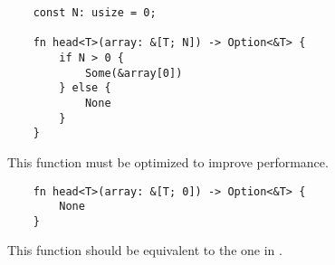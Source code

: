 \begin{listing}
    \begin{verbatim}
    const N: usize = 0;

    fn head<T>(array: &[T; N]) -> Option<&T> {
        if N > 0 {
            Some(&array[0])
        } else {
            None
        }
    }
    \end{verbatim}
    \caption{This function must be optimized to improve performance.}
    \label{lst:static_control_flow}
\end{listing}

\begin{listing}
    \begin{verbatim}
    fn head<T>(array: &[T; 0]) -> Option<&T> {
        None
    }
    \end{verbatim}
    \caption{This function should be equivalent to the one in .}
    \label{lst:optimized}
\end{listing}
